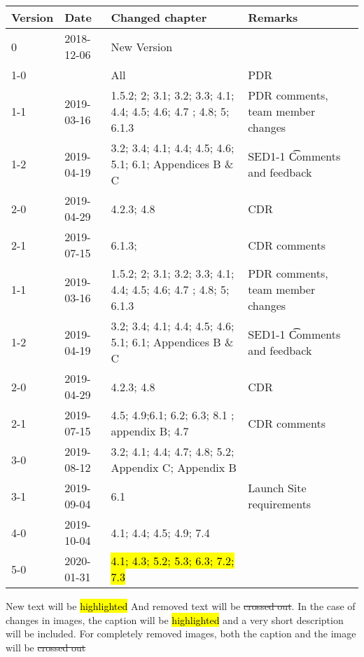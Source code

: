 \begin{longtable}{|p{1.5cm}|p{2cm}|p{6cm}|p{3cm}|}\hline
\centering
\textbf{Version} & \textbf{Date} & \textbf{Changed chapter} & \textbf{Remarks}  \\\hline
0       & 2018-12-06        & New Version                                                           &                                       \\\hline
1-0     &                   & All                                                                   & PDR                                   \\\hline
1-1     & 2019-03-16        & 1.5.2; 2; 3.1; 3.2; 3.3; 4.1; 4.4; 4.5; 4.6; 4.7 ; 4.8; 5; 6.1.3      & PDR comments, team member changes     \\\hline
1-2     & 2019-04-19        & 3.2; 3.4; 4.1; 4.4; 4.5; 4.6; 5.1; 6.1; Appendices B \& C             & SED1-1 \t Comments and feedback       \\\hline
2-0     & 2019-04-29        & 4.2.3; 4.8                                                            & CDR                                   \\\hline
2-1 & 2019-07-15   & 6.1.3;                                                          & CDR comments                     \\\hline

1-1		& 2019-03-16	& 1.5.2; 2; 3.1; 3.2; 3.3; 4.1; 4.4; 4.5; 4.6; 4.7 ; 4.8; 5; 6.1.3		& PDR comments, team member changes 			\\\hline
1-2		& 2019-04-19 	& 3.2; 3.4; 4.1; 4.4; 4.5; 4.6; 5.1; 6.1; Appendices B \& C 			& SED1-1 \t Comments and feedback \\\hline
2-0 & 2019-04-29 & 4.2.3; 4.8													& CDR \\\hline
2-1 & 2019-07-15 & 4.5; 4.9;6.1; 6.2; 6.3; 8.1 ; appendix B; 4.7												& CDR comments \\\hline
3-0 & 2019-08-12 & 3.2; 4.1; 4.4; 4.7; 4.8; 5.2; Appendix C; Appendix B & \\\hline
3-1 & 2019-09-04 & 6.1& Launch Site requirements \\\hline
4-0 & 2019-10-04 & 4.1; 4.4; 4.5; 4.9; 7.4 & \\\hline
5-0 & 2020-01-31 & \hl{4.1; 4.3; 5.2; 5.3; 6.3; 7.2; 7.3} & \\\hline
\end{longtable}       

New text will be \hl{highlighted} And removed text will be \st{crossed out}. In the case of changes in images, the caption will be \hl{highlighted} and a very short description will be included. For completely removed images, both the caption and the image will be \st{crossed out} 
